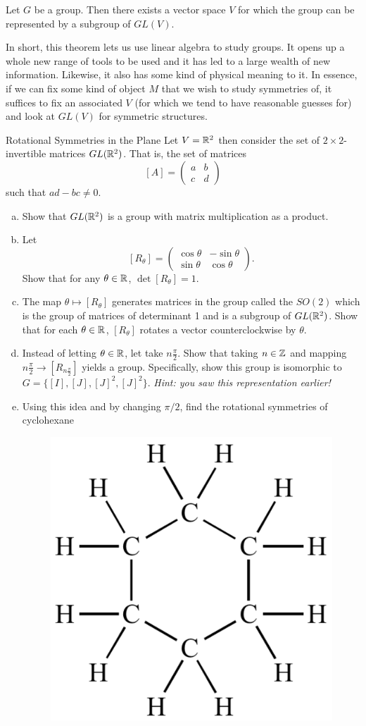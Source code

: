 \documentclass{article}
\theoremstyle{indented}
\begin{document}
\begin{theorem}
Let $G$ be a group. Then there exists a vector space $V$ for which the group can be represented by a subgroup of $GL(V)$.
\end{theorem}

In short, this theorem lets us use linear algebra to study groups. It opens up a whole new range of tools to be used and it has led to a large wealth of new information. Likewise, it also has some kind of physical meaning to it. In essence, if we can fix some kind of object $M$ that we wish to study symmetries of, it suffices to fix an associated $V$ (for which we tend to have reasonable guesses for) and look at $GL(V)$ for symmetric structures.

\begin{problem}{Rotational Symmetries in the Plane}
Let $V=\mathbb{R}^2$ then consider the set of $2\times 2$-invertible matrices $GL(\mathbb{R}^2)$. That is, the set of matrices
\[
[A]=\begin{pmatrix} a & b \\ c & d \end{pmatrix}
\]
such that $ad-bc\neq 0$.
\begin{enumerate}[(a)]
\item Show that $GL(\mathbb{R}^2)$ is a group with matrix multiplication as a product.
\item Let
\[
[R_\theta] = \begin{pmatrix} \cos \theta & -\sin \theta \\ \sin \theta & \cos \theta \end{pmatrix}.
\]
Show that for any $\theta \in \mathbb{R}$, $\det [R_\theta]=1$.
\item The map $\theta \mapsto [R_\theta]$ generates matrices in the group called the  $SO(2)$ which is the group of matrices of determinant 1 and is a subgroup of $GL(\mathbb{R}^2)$. Show that for each $\theta \in \mathbb{R}$, $[R_\theta]$ rotates a vector counterclockwise by $\theta$.
\item Instead of letting $\theta \in \mathbb{R}$, let take $n\frac{\pi}{2}$. Show that taking $n\in \mathbb{Z}$ and mapping $n\frac{\pi}{2}\to [R_{n\frac{\pi}{2}}]$ yields a group. Specifically, show this group is isomorphic to $G=\{[I],[J],[J]^2,[J]^2\}$. \emph{Hint: you saw this representation earlier!}
\item Using this idea and by changing $\pi/2$, find the rotational symmetries of cyclohexane
    \begin{figure}[H]
        \centering
        \includegraphics[width=.3\textwidth]{cyclohexane-500x500.png}

\end{figure}
\end{enumerate}
\end{problem}
\end{document}
